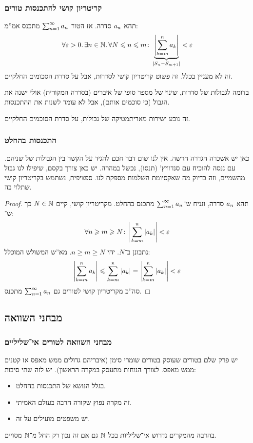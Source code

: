 \documentclass[name=רשימות חשבון דיפרנציאלי ואינטגרלי 1א]{../../../tex/classes/megasumPreamble}
\begin{document}
	\subsubsection{קריטריון קושי להתכנסות טורים}
	תהא $a_n$ סדרה. אז הטור $\sum_{n = 1}^{\infty} a_n$ מתכנס אמ''מ:
	\[ \forall \eg > 0.\, \exists n \in \N.\, \forall N \le n \le m \co \underbrace{\sof{\sum_{k = m}^{n} a_k}}_{\sof{S_n -S_{m + 1}}} < \eg \]
	זה לא מעניין בכלל. זה פשוט קריטריון קושי לסדרות, אבל על סדרת הסכומים החלקיים.


	בדומה לגבולות של סדרות, שינוי של מספר סופי של איברים (בסדרה המקורית) אולי ישנה את הגבול (כי סוכמים אותם), אבל לא עומד לשנות את ההתכנסות.

	זה נובע ישירות מאריתמטיקה של גבולות, על סדרת הסוכמים החלקיים.

	\subsubsection{התכנסות בהחלט}
	כאן יש אשכרה הגדרה חדשה.
	אין לנו שום דבר חכם להגיד על הקשר בין הגבולות של שניהם. עם ננסה להוכיח עם סנדוויץ' (תנסו), נכשל במהרה. יש כאן צורך בקסם, שיפילו לנו גבול מהשמיים, וזה בדיוק מה שאקסיומת השלמות מספקת לנו. ספציפית, נשתמש בקריטריון קושי שתלוי בה.
	\begin{proof}
		תהא $a_n$ סדרה, ונניח ש־$\sum_{n = 1}^{\infty} a_n$ מתכנס בהחלט. מקריטריון קושי, קיים $N \in \mathbb{N}$ כך ש־:
		\[ \forall n \ge m \ge N \co \sof{\sum_{k = m}^{n}\sof{a_k}}<\eg \]
		נתבונן ב־$N$. יהי $n \ge m \ge N$. מא''ש המשולש המוכלל:
		\[ \sof{\sum_{k = m}^{n} a_k} \le \sum_{k = m}^{n} \sof{a_k} = \sof{\sum_{k = m}^{n} \sof{a_k}} < \eg \]
		סה''כ מקריטריון קושי לטורים גם $\sum_{n = 1}^{\infty} a_n$ מתכנס.
	\end{proof}

	\subsection{מבחני השוואה}
	\subsubsection{מבחני השוואה לטורים אי־שליליים}
	יש פרק שלם בטורים שעוסק בטורים שומרי סימן (איבריהם גדולים ממש מאפס או קטנים ממש מאפס. לצורך הנוחות מתעסק במקרה הראשון). יש לזה שתי סיבות:
	\begin{itemize}
		\item בגלל הנושא של התכנסות בהחלט.
		\item זה מקרה נפוץ שקורה הרבה בעולם האמיתי.
		\item יש משפטים מועילים על זה.
	\end{itemize}
	בהרבה מהמקרים נדרוש אי־שליליות בכל $\mathbb{N}$ גם אם זה נכון רק החל מ־$\mathbb{N}$ מסויים.
\end{document}
